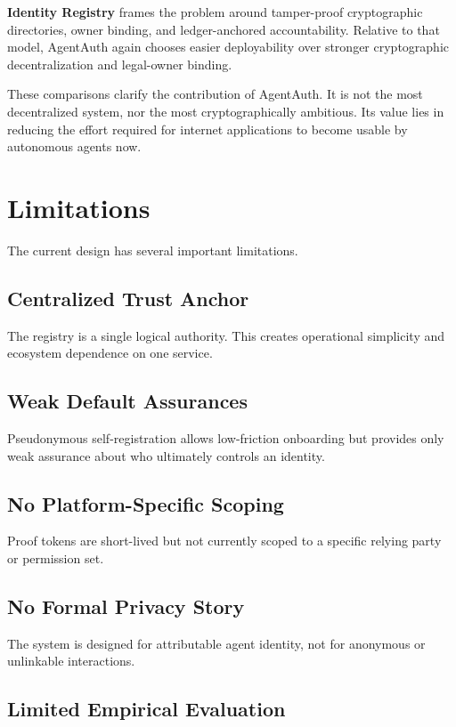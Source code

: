 \documentclass[11pt]{article}
\begin{document}
\textbf{Identity Registry} frames the problem around tamper-proof cryptographic directories, owner binding, and ledger-anchored accountability. Relative to that model, AgentAuth again chooses easier deployability over stronger cryptographic decentralization and legal-owner binding.

These comparisons clarify the contribution of AgentAuth. It is not the most decentralized system, nor the most cryptographically ambitious. Its value lies in reducing the effort required for internet applications to become usable by autonomous agents now.

\section{Limitations}

The current design has several important limitations.

\subsection{Centralized Trust Anchor}

The registry is a single logical authority. This creates operational simplicity and ecosystem dependence on one service.

\subsection{Weak Default Assurances}

Pseudonymous self-registration allows low-friction onboarding but provides only weak assurance about who ultimately controls an identity.

\subsection{No Platform-Specific Scoping}

Proof tokens are short-lived but not currently scoped to a specific relying party or permission set.

\subsection{No Formal Privacy Story}

The system is designed for attributable agent identity, not for anonymous or unlinkable interactions.

\subsection{Limited Empirical Evaluation}
\end{document}
